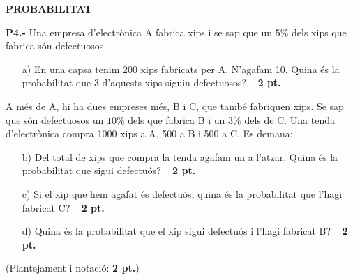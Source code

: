 \documentclass{report}
\begin{document}
\vspace{0.5 cm}
\noindent
\textbf{PROBABILITAT}

\vspace{0.5 cm}
\noindent\textbf{P4.-}
Una empresa d'electrònica A fabrica xips i se sap que un $5\%$ dels xips que fabrica
són defectuosos.

\begin{enumerate}
\item[a)] En una capsa tenim 200 xips fabricats per A. N'agafam 10.
Quina és la probabilitat que 3 d'aquests xips siguin defectuosos?
\ \hfill{\textbf{ 2 pt.}}
\end{enumerate}

A més de A, hi ha dues empreses més, B i C, que també fabriquen xips. 
Se sap que són defectuosos un $10\%$ dels que fabrica B i un $3\%$
dels de C. Una tenda d'electrònica compra 1000 xips a A, 500 a B i 500 a C.
Es demana:

\begin{enumerate}
\item[b)] Del total de xips que compra la tenda agafam un a l'atzar.
Quina és la probabilitat que sigui defectuós?
\ \hfill{\textbf{ 2 pt.}}
\item[c)] Si el xip que hem agafat és defectuós, quina és la probabilitat
que l'hagi fabricat C?
\ \hfill{\textbf{ 2 pt.}}
\item[d)] Quina és la probabilitat que el xip sigui defectuós i l'hagi
fabricat B?
\ \hfill{\textbf{ 2 pt.}}
\end{enumerate}

\noindent
(Plantejament i notació: \textbf{ 2 pt.})
\end{document}
